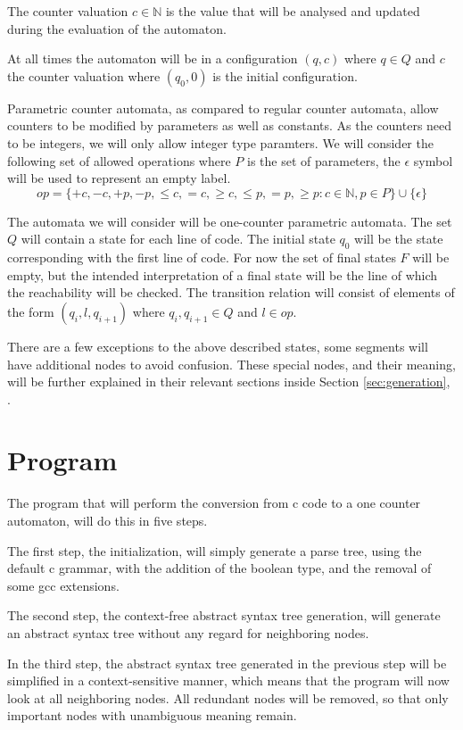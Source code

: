 \documentclass[12pt]{article}
\begin{document}
The counter valuation $c \in \mathbb{N}$ is the value that will be analysed and updated during the evaluation of the automaton.

At all times the automaton will be in a configuration $(q, c)$ where $q \in Q$ and $c$ the counter valuation where $(q_0, 0)$ is the initial configuration.

Parametric counter automata, as compared to regular counter automata, allow counters to be modified by parameters as well as constants. As the counters need to be integers, we will only allow integer type paramters. We will consider the following set of allowed operations where $P$ is the set of parameters, the $\epsilon$ symbol will be used to represent an empty label.
\[
 op = \{+c, -c, +p, -p, \leq c, =c, \geq c, \leq p, =p, \geq p: c \in \mathbb{N}, p \in P\} \cup \{\epsilon\}
\]

The automata we will consider will be one-counter parametric automata. The set $Q$ will contain a state for each line of code. The initial state $q_0$ will be the state corresponding with the first line of code. For now the set of final states $F$ will be empty, but the intended interpretation of a final state will be the line of which the reachability will be checked. The transition relation will consist of elements of the form $(q_i, l, q_{i+1})$ where $q_i, q_{i+1} \in Q$ and $l \in op$. 

There are a few exceptions to the above described states, some segments will have additional nodes to avoid confusion. These special nodes, and their meaning, will be further explained in their relevant sections inside Section \ref{sec:generation}, .

\section{Program}
The program that will perform the conversion from c code to a one counter automaton, will do this in five steps.

The first step, the initialization, will simply generate a parse tree, using the default c grammar, with the addition of the boolean type, and the removal of some gcc extensions.

The second step, the context-free abstract syntax tree generation, will generate an abstract syntax tree without any regard for neighboring nodes.

In the third step, the abstract syntax tree generated in the previous step will be simplified in a context-sensitive manner, which means that the program will now look at all neighboring nodes. All redundant nodes will be removed, so that only important nodes with unambiguous meaning remain.
\end{document}
